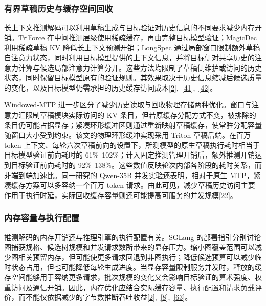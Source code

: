 \documentclass[11pt,a4paper,UTF8,fontset=none,scheme=plain,zihao=-4]{ctexart}
\begin{document}
\hypertarget{section-5-2-2}{%
\subsubsection{有界草稿历史与缓存空间回收}\label{section-5-2-2}}

长上下文推测解码可以利用草稿生成与目标验证对历史信息的不同要求减少内存开销。TriForce
在中间推测层级使用稀疏缓存，再由完整目标模型验证；MagicDec 利用稀疏草稿
KV 降低长上下文预测开销；LongSpec
通过局部窗口限制额外草稿自注意力状态，同时利用目标模型提供的上下文信息，并将目标侧对共享历史的注意力计算与候选局部注意力计算分开。这些方法均限制了草稿侧维护或访问的历史状态，同时保留目标模型原有的验证规则。其效果取决于历史信息缩减后候选质量的变化，以及目标模型仍需承担的历史缓存访问成本\protect\hyperlink{ref-magicdec}{{[}2{]}},~\protect\hyperlink{ref-triforce}{{[}41{]}},~\protect\hyperlink{ref-longspec}{{[}42{]}}。

Windowed-MTP
进一步区分了减少历史读取与回收物理存储两种优化。窗口与注意力汇限制草稿模块实际访问的
KV
条目，但若原缓存分配方式不变，被排除的条目仍可能占据显存；紧凑环形缓冲区则通过重新映射草稿缓存，使常驻分配容量随窗口大小受到约束。该文的物理环形缓冲实现采用
Triton 草稿后端。在百万 token
上下文、每轮六次草稿前向的设置下，所测模型的原生草稿执行耗时相当于目标模型验证前向耗时的
61\%--102\%；计入固定推测管理开销后，额外推测开销达到目标验证前向耗时的
92\%--138\%。这些数值反映轮次内部各阶段的耗时关系，而非端到端加速比。同一研究的
Qwen-35B 并发实验还表明，相对于原生 MTP，紧凑缓存方案可以多容纳一个百万
token
请求。由此可见，减少草稿历史访问主要作用于执行时延，实际回收缓存容量则还可能提高可服务的并发规模\protect\hyperlink{ref-windowedmtp}{{[}22{]}}。

\hypertarget{section-5-2-3}{%
\subsubsection{内存容量与执行配置}\label{section-5-2-3}}

推测解码的内存开销还与推理引擎的执行配置有关。SGLang
的部署指引分别讨论图捕获规格、候选树规模和并发请求数所带来的显存压力。缩小图覆盖范围可以减少图相关预留内存，但可能使更多请求回退到非图执行；降低候选预算可以减少临时状态占用，但也可能降低每轮生成进度。当显存容量限制服务并发时，释放的缓存空间能够用于容纳更多请求，批次规模的变化又会影响目标验证的算术强度、权重访问及通信开销。因此，内存优化应结合实际缓存容量、执行配置和请求负载评价，而不能仅依据减少的字节数推断吞吐收益\protect\hyperlink{ref-magicdec}{{[}2{]}},~\protect\hyperlink{ref-evict}{{[}8{]}},~\protect\hyperlink{ref-sglangdocs}{{[}63{]}}。
\end{document}
